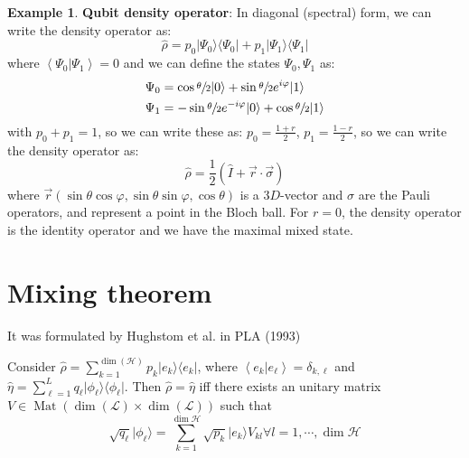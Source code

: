 \documentclass[12pt]{book}
\theoremstyle{definition}
\newtheorem*{expl}{\bfseries Example}
\renewcommand{\v}[1]{\vec{#1}}
\newcommand{\de}{\delta}
\newcommand{\p}{\varphi}
\newcommand{\scalar}[1]{\left\langle {#1}\right\rangle}
\let\oldsum\sum
\renewcommand{\sum}[2]{\oldsum\limits_{#1}^{#2}}
\newcommand{\si}{\sigma}
\newcommand{\para}[1]{\left( {#1} \right)}
\newcommand{\bra}[1]{\langle {#1} \vert}
\newcommand{\ket}[1]{\vert {#1} \rangle}
\DeclareMathOperator{\mat}{Mat}
\begin{document}
\begin{expl}
\textbf{Qubit density operator}: In diagonal (spectral) form, we can write the density operator as:
\begin{equation*}
  \hat \rho = p_0 \ket{\Psi_0}\bra{\Psi_0} + p_1 \ket{\Psi_1}\bra{\Psi_1}
\end{equation*}
where $\scalar{\Psi_0\vert\Psi_1} = 0$ and we can define the states $\Psi_0, \Psi_1$ as:
\begin{align*}
 \Psi_0 & = \cos\sfrac\theta 2 \ket{0} + \sin \sfrac\theta 2 e^{i\p} \ket{1} \\
 \Psi_1 & = - \sin \sfrac\theta 2 e^{-i\p}\ket{0} + \cos \sfrac\theta 2 \ket{1}
\end{align*}
with $p_0 + p_1 = 1$, so we can write these as: $p_0 = \frac{1 + r}{2}$, $p_1 = \frac{1 - r}{2}$, so we can write the density operator as:
\begin{equation}
  \hat \rho = \frac{1}{2} \para{\hat I + \v r \cdot \v \si}
\end{equation}
where $\v r(\sin\theta \cos\p, \sin\theta \sin\p, \cos\theta)$ is a $3D$-vector and $\si$ are the Pauli operators, and represent a point in the Bloch ball. For $r = 0$, the density operator is the identity operator and we have the maximal mixed state.
\end{expl}

\section{Mixing theorem}
It was formulated by Hughstom et al. in PLA (1993)
\begin{tcolorbox}
  Consider $\hat \rho = \sum{k=1}{\dim(\mathcal H)} p_k \ket{e_k}\bra{e_k}$, where $\scalar{e_k \vert e_\ell} = \de_{k, \ell}$ and $\hat \eta = \sum{\ell = 1}{L} q_\ell \ket{\phi_\ell}\bra{\phi_\ell}$.
  Then $\hat \rho = \hat \eta$ iff there exists an unitary matrix $V \in \mat(\dim (\mathcal L) \times \dim(\mathcal L))$ such that
  \begin{equation}
  \sqrt{q_\ell} \ket{\phi_\ell} = \sum{k=1}{\dim \mathcal H} \sqrt{p_k} \ket{e_k} V_{kl} \forall l = 1, \cdots, \dim \mathcal H
  \end{equation}
\end{tcolorbox}
\end{document}
